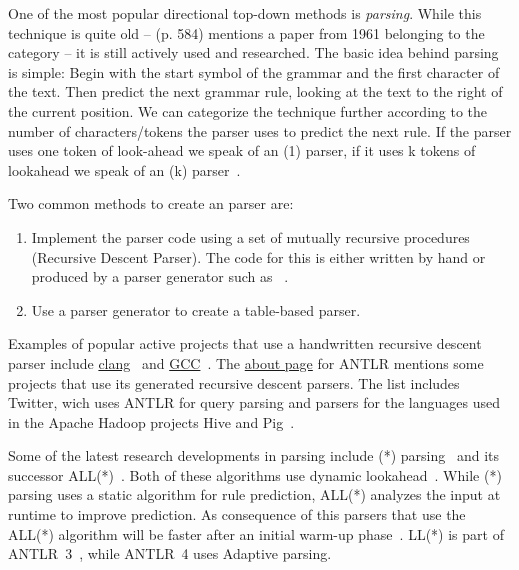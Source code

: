 One of the most popular directional top-down methods is \emph{ parsing}. While this technique is quite old –  (p. 584) mentions a paper from 1961 belonging to the  category – it is still actively used and researched. The basic idea behind  parsing is simple: Begin with the start symbol of the grammar and the first character of the text. Then predict the next grammar rule, looking at the text to the right of the current position. We can categorize the technique further according to the number of characters/tokens the parser uses to predict the next rule. If the parser uses one token of look-ahead we speak of an (1) parser, if it uses k tokens of lookahead we speak of an (k) parser~\cite{rosenkrantz1969properties}.

Two common methods to create an  parser are:

\begin{enumerate}

  \item Implement the parser code using a set of mutually recursive procedures (Recursive Descent Parser). The code for this is either written by hand or produced by a parser generator such as ~\cite{parr2013recursive}.

  \item Use a parser generator to create a table-based parser.

\end{enumerate}

Examples of popular active projects that use a handwritten recursive descent parser include \href{http://clang.llvm.org}{clang}~\cite{bendersky2012clang} and \href{http://gcc.gnu.org}{GCC}~\cite{myers2008cparser}. The \href{http://www.antlr.org/about.html}{about page} for \gls{ANTLR} mentions some projects that use its generated recursive descent parsers. The list includes Twitter, wich uses ANTLR for query parsing and parsers for the languages used in the Apache Hadoop projects Hive and Pig~\cite{parr2013definitive}.

Some of the latest research developments in  parsing include (*) parsing~\cite{parr2011ll} and its successor \gls{ALL(*)}~\cite{parr2014adaptive}. Both of these algorithms use dynamic lookahead~\cite[p. 1]{parr2011ll}. While (*) parsing uses a static algorithm for rule prediction, ALL(*) analyzes the input at runtime to improve prediction. As consequence of this parsers that use the \gls{ALL(*)} algorithm will be faster after an initial warm-up phase~\cite[p. 3]{parr2014adaptive}. LL(*) is part of \gls{ANTLR}~3~\cite[p. 3]{parr2014adaptive}, while \gls{ANTLR}~4 uses Adaptive  parsing.

